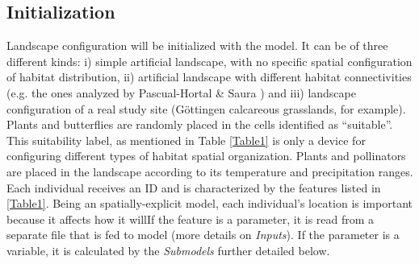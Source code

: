 \documentclass[11pt, a4paper]{article}
\begin{document}
\subsection{Initialization}
Landscape configuration will be initialized with the model. It can be of three different kinds: i) simple artificial landscape, with no specific spatial configuration of habitat distribution, ii) artificial landscape with different habitat connectivities (e.g. the ones analyzed by Pascual-Hortal & Saura \cite{PascualHorta}) and iii) landscape configuration of a real study site (G\"ottingen calcareous grasslands, for example). Plants and butterflies are randomly placed in the cells identified as “suitable”. This suitability label, as mentioned in Table \ref{Table1} is only a device for configuring different types of habitat spatial organization.
Plants and pollinators are placed in the landscape according to its temperature and precipitation ranges. Each individual receives an ID and is characterized by the features listed in \ref{Table1}. Being an spatially-explicit model, each individual's location is important because it affects how it willIf the feature is a parameter, it is read from a separate file that is fed to model (more details on \textit{Inputs}). If the parameter is a variable, it is calculated by the \textit{Submodels} further detailed below.
\end{document}
